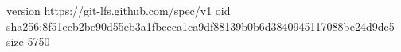 version https://git-lfs.github.com/spec/v1
oid sha256:8f51ecb2be90d55eb3a1fbceca1ca9df88139b0b6d3840945117088be24d9de5
size 5750
